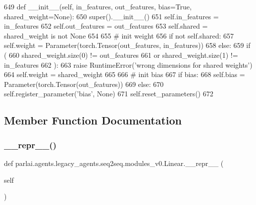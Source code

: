 \begin{DoxyCode}
649     \textcolor{keyword}{def }\_\_init\_\_(self, in\_features, out\_features, bias=True, shared\_weight=None):
650         super().\_\_init\_\_()
651         self.in\_features = in\_features
652         self.out\_features = out\_features
653         self.shared = shared\_weight \textcolor{keywordflow}{is} \textcolor{keywordflow}{not} \textcolor{keywordtype}{None}
654 
655         \textcolor{comment}{# init weight}
656         \textcolor{keywordflow}{if} \textcolor{keywordflow}{not} self.shared:
657             self.weight = Parameter(torch.Tensor(out\_features, in\_features))
658         \textcolor{keywordflow}{else}:
659             \textcolor{keywordflow}{if} (
660                 shared\_weight.size(0) != out\_features
661                 \textcolor{keywordflow}{or} shared\_weight.size(1) != in\_features
662             ):
663                 \textcolor{keywordflow}{raise} RuntimeError(\textcolor{stringliteral}{'wrong dimensions for shared weights'})
664             self.weight = shared\_weight
665 
666         \textcolor{comment}{# init bias}
667         \textcolor{keywordflow}{if} bias:
668             self.bias = Parameter(torch.Tensor(out\_features))
669         \textcolor{keywordflow}{else}:
670             self.register\_parameter(\textcolor{stringliteral}{'bias'}, \textcolor{keywordtype}{None})
671         self.reset\_parameters()
672 
\end{DoxyCode}


\subsection{Member Function Documentation}
\mbox{\label{classparlai_1_1agents_1_1legacy__agents_1_1seq2seq_1_1modules__v0_1_1Linear_aad59400f7c8edf9b07305749b928186b}} 
\subsubsection{\texorpdfstring{\+\_\+\+\_\+repr\+\_\+\+\_\+()}{\_\_repr\_\_()}}
{\footnotesize\ttfamily def parlai.\+agents.\+legacy\+\_\+agents.\+seq2seq.\+modules\+\_\+v0.\+Linear.\+\_\+\+\_\+repr\+\_\+\+\_\+ (\begin{DoxyParamCaption}\item[{}]{self }\end{DoxyParamCaption})}




